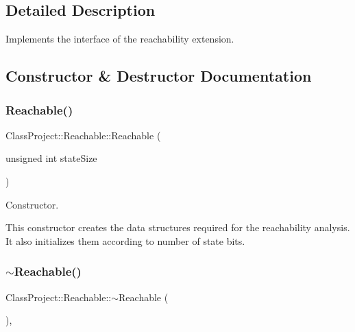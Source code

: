 \subsection{Detailed Description}
Implements the interface of the reachability extension. 

\subsection{Constructor \& Destructor Documentation}
\mbox{\label{classClassProject_1_1Reachable_ab5198f10bf77a813a7547bb5cbf72fc9}} 
\subsubsection{\texorpdfstring{Reachable()}{Reachable()}}
{\footnotesize\ttfamily Class\+Project\+::\+Reachable\+::\+Reachable (\begin{DoxyParamCaption}\item[{unsigned int}]{state\+Size }\end{DoxyParamCaption})\hspace{0.3cm}{\ttfamily [explicit]}}



Constructor. 

This constructor creates the data structures required for the reachability analysis. It also initializes them according to number of state bits. \mbox{\label{classClassProject_1_1Reachable_a1f39c60e57237bf1af65657f41a58c2f}} 
\subsubsection{\texorpdfstring{$\sim$\+Reachable()}{~Reachable()}}
{\footnotesize\ttfamily Class\+Project\+::\+Reachable\+::$\sim$\+Reachable (\begin{DoxyParamCaption}{ }\end{DoxyParamCaption})\hspace{0.3cm}{\ttfamily [override]}, {\ttfamily [default]}}

